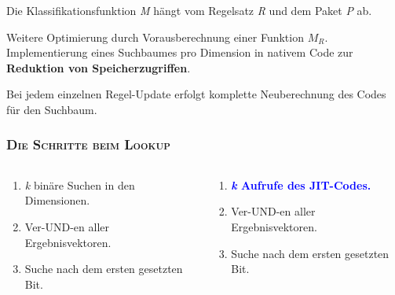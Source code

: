 \documentclass[xcolor=x11names,compress]{beamer}
\renewcommand{\(}{\begin{columns}}
\renewcommand{\)}{\end{columns}}
\newcommand{\<}[1]{\begin{column}{#1}}
\renewcommand{\>}{\end{column}}
\begin{document}
\begin{frame}
  \begin{tcolorbox}[colback=teal!5!white,colframe=teal!75!black,title=Erinnerung,drop fuzzy shadow]
  Die Klassifikationsfunktion \textit{M} hängt vom Regelsatz \textit{R} und dem Paket \textit{P} ab.
  \end{tcolorbox}
  \pause
  \begin{tcolorbox}[colback=blue!5!white,colframe=blue!75!black,title=Idee,drop fuzzy shadow]
  Weitere Optimierung durch Vorausberechnung einer Funktion $M_R$.\\
  Implementierung eines Suchbaumes pro Dimension in nativem Code zur \textbf{Reduktion von Speicherzugriffen}.
  \end{tcolorbox}
  \pause
  \begin{tcolorbox}[colback=red!5!white,colframe=red!75!black,title=Nachteil,drop fuzzy shadow]
  Bei jedem einzelnen Regel-Update erfolgt komplette Neuberechnung des Codes für den Suchbaum.
  \end{tcolorbox}
\end{frame}

\begin{frame}
  \frametitle{\scshape Die Schritte beim Lookup}
  \begin{columns}[T] %
    \begin{column}{.48\textwidth}
    \begin{tcolorbox}[colback=red!5!white,colframe=red!75!black,title=Standard Bitvector,drop fuzzy shadow]
    \begin{enumerate}[label=\arabic*)]%
      \item \textit{k} binäre Suchen in den Dimensionen.
      \item Ver-UND-en aller Ergebnisvektoren.
      \item Suche nach dem ersten gesetzten Bit.
    \end{enumerate}
    \end{tcolorbox}
    \end{column}
    \hfill
    \begin{column}{.48\textwidth}
    \begin{tcolorbox}[colback=blue!5!white,colframe=blue!75!black,title=Bitvector mit JIT,drop fuzzy shadow]
    \begin{enumerate}[label=\arabic*)]%
      \item \textcolor{blue}{\textbf{\textit{k} Aufrufe des JIT-Codes.}}
      \item Ver-UND-en aller Ergebnisvektoren.
      \item Suche nach dem ersten gesetzten Bit.
    \end{enumerate}
    \end{tcolorbox}
    \end{column}
  \end{columns}
\end{frame}
\end{document}
